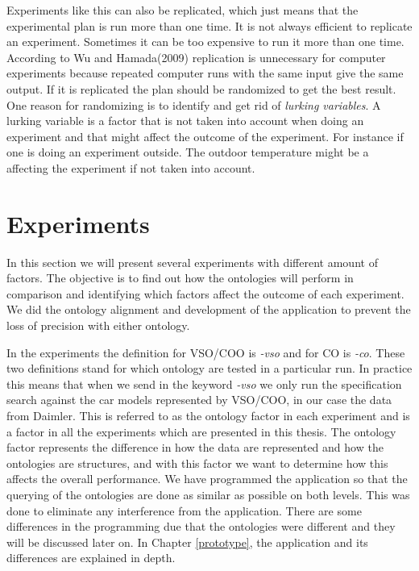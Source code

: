\documentclass{llncs}
\begin{document}
Experiments like this can also be replicated, which just means that
the experimental plan is run more than one time.  It is not always
efficient to replicate an experiment. Sometimes it can be too
expensive to run it more than one time.  According to Wu and
Hamada(2009) replication is unnecessary for computer experiments
because repeated computer runs with the same input give the same
output.  If it is replicated the plan should be randomized to get the
best result. One reason for randomizing is to identify and get rid of
\textit{lurking variables}. A lurking variable is a factor that is not
taken into account when doing an experiment and that might affect the
outcome of the experiment. For instance if one is doing an experiment
outside. The outdoor temperature might be a affecting the experiment
if not taken into account.~\cite{FullFac}

\section{Experiments}
In this section we will present several experiments with different
amount of factors.  The objective is to find out how the ontologies
will perform in comparison and identifying which factors affect the
outcome of each experiment. We did the ontology alignment and
development of the application to prevent the loss of precision with
either ontology.

In the experiments the definition for VSO/COO is \textit{-vso} and for
CO is \textit{-co}.  These two definitions stand for which ontology
are tested in a particular run. In practice this means that when we
send in the keyword \textit{-vso} we only run the specification search
against the car models represented by VSO/COO, in our case the data
from Daimler. This is referred to as the ontology factor in each
experiment and is a factor in all the experiments which are presented
in this thesis. The ontology factor represents the difference in how
the data are represented and how the ontologies are structures, and
with this factor we want to determine how this affects the overall
performance.  We have programmed the application so that the querying
of the ontologies are done as similar as possible on both levels. This
was done to eliminate any interference from the application. There are
some differences in the programming due that the ontologies were
different and they will be discussed later on.  In Chapter
\ref{prototype}, the application and its differences are explained in
depth.
\end{document}

